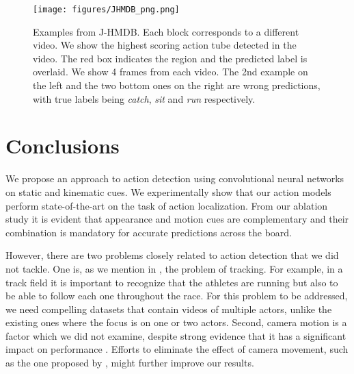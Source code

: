 \documentclass[10pt,twocolumn,letterpaper]{article}
\begin{document}
\begin{figure*}[t]
\begin{center}
\texttt{[image: figures/JHMDB\_png.png]}
\end{center}
   \caption{Examples from J-HMDB. Each block corresponds to a different video. We show the highest scoring action tube detected in the video. The red box indicates the region and the predicted label is overlaid. We show 4 frames from each video. The 2nd example on the left and the two bottom ones on the right are wrong predictions, with true labels being \textit{catch}, \textit{sit} and \textit{run} respectively.} 
\end{figure*}





 
\section{Conclusions}

We propose an approach to action detection using convolutional neural networks on static and kinematic cues. We experimentally show that our action models perform state-of-the-art on the task of action localization. From our ablation study it is evident that appearance and motion cues are complementary and their combination is mandatory for accurate predictions across the board.

However, there are two problems closely related to action detection that we did not tackle. One is, as we mention in , the problem of tracking. For example, in a track field it is important to recognize that the athletes are running but also to be able to follow each one throughout the race. For this problem to be addressed, we need compelling datasets that contain videos of multiple actors, unlike the existing ones where the focus is on one or two actors. Second, camera motion is a factor which we did not examine, despite strong evidence that it has a significant impact on performance \cite{wang2013,Jain2013}. Efforts to eliminate the effect of camera movement, such as the one proposed by \cite{wang2013}, might further improve our results.



\clearpage
{\small


}
\end{document}
